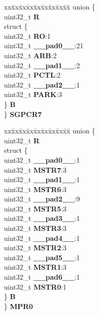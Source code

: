\begin{DoxyCompactItemize}
\begin{tabbing}
\end{tabbing}\item 
\mbox{\label{structXBAR__tag_ac3bd2bcc591d15729bc7960efbdb8e62}} 
\begin{tabbing}
xx\=xx\=xx\=xx\=xx\=xx\=xx\=xx\=xx\=\kill
union \{\\
\>uint32\_t {\bfseries R}\\
\>struct \{\\
\>\>uint32\_t {\bfseries RO}:1\\
\>\>uint32\_t {\bfseries \_\_pad0\_\_}:21\\
\>\>uint32\_t {\bfseries ARB}:2\\
\>\>uint32\_t {\bfseries \_\_pad1\_\_}:2\\
\>\>uint32\_t {\bfseries PCTL}:2\\
\>\>uint32\_t {\bfseries \_\_pad2\_\_}:1\\
\>\>uint32\_t {\bfseries PARK}:3\\
\>\} {\bfseries B}\\
\} {\bfseries SGPCR7}\\

\end{tabbing}\item 
\mbox{\label{structXBAR__tag_af2f707969598f2c92e51c89e1444f6c7}} 
\begin{tabbing}
xx\=xx\=xx\=xx\=xx\=xx\=xx\=xx\=xx\=\kill
union \{\\
\>uint32\_t {\bfseries R}\\
\>struct \{\\
\>\>uint32\_t {\bfseries \_\_pad0\_\_}:1\\
\>\>uint32\_t {\bfseries MSTR7}:3\\
\>\>uint32\_t {\bfseries \_\_pad1\_\_}:1\\
\>\>uint32\_t {\bfseries MSTR6}:3\\
\>\>uint32\_t {\bfseries \_\_pad2\_\_}:9\\
\>\>uint32\_t {\bfseries MSTR5}:3\\
\>\>uint32\_t {\bfseries \_\_pad3\_\_}:1\\
\>\>uint32\_t {\bfseries MSTR3}:3\\
\>\>uint32\_t {\bfseries \_\_pad4\_\_}:1\\
\>\>uint32\_t {\bfseries MSTR2}:3\\
\>\>uint32\_t {\bfseries \_\_pad5\_\_}:1\\
\>\>uint32\_t {\bfseries MSTR1}:3\\
\>\>uint32\_t {\bfseries \_\_pad6\_\_}:1\\
\>\>uint32\_t {\bfseries MSTR0}:1\\
\>\} {\bfseries B}\\
\} {\bfseries MPR0}\\


\end{tabbing}
\end{DoxyCompactItemize}
